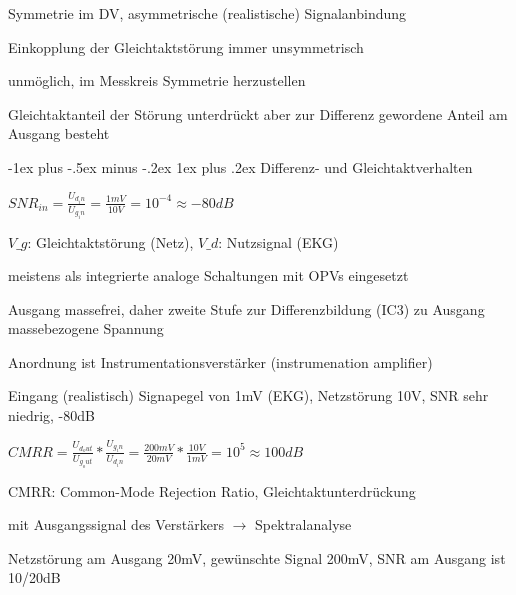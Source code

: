 \documentclass[a4paper]{article}
\makeatletter
\renewcommand{\subsubsection}{\@startsection{subsubsection}{3}{0mm}%
 {-1ex plus -.5ex minus -.2ex}%
 {1ex plus .2ex}%
 {\normalfont\small\bfseries}}
\makeatother
\begin{document}
\begin{multicols}{3}
  Symmetrie im DV, asymmetrische (realistische) Signalanbindung
  \begin{itemize*}
    \item Einkopplung der Gleichtaktstörung immer unsymmetrisch
    \item unmöglich, im Messkreis Symmetrie herzustellen
    \item Gleichtaktanteil der Störung unterdrückt aber zur Differenz gewordene Anteil am Ausgang besteht
  \end{itemize*}

  \subsubsection{Differenz- und Gleichtaktverhalten}\label{differenz--und-gleichtaktverhalten}
  \begin{itemize*}
    \item $SNR_{in} = \frac{U_{d_in}}{U_{g_in}}=\frac{1mV}{10V}=10^{-4}\approx -80dB$
    \item $V\_g$: Gleichtaktstörung (Netz), $V\_d$: Nutzsignal (EKG)
    \item meistens als integrierte analoge Schaltungen mit OPVs eingesetzt
    \item Ausgang massefrei, daher zweite Stufe zur Differenzbildung (IC3) zu Ausgang massebezogene Spannung
    \item Anordnung ist Instrumentationsverstärker (instrumenation amplifier)
    \item Eingang (realistisch) Signapegel von 1mV (EKG), Netzstörung 10V, SNR sehr niedrig, -80dB
    \item $CMRR=\frac{U_{d_out}}{U_{g_out}}*\frac{U_{g_in}}{U_{d_in}}=\frac{200mV}{20mV} *\frac{10V}{1mV}=10^5 \approx 100dB$
    \item CMRR: Common-Mode Rejection Ratio, Gleichtaktunterdrückung
    \item mit Ausgangssignal des Verstärkers $\rightarrow$ Spektralanalyse
    \item Netzstörung am Ausgang 20mV, gewünschte Signal 200mV, SNR am Ausgang ist 10/20dB
  \end{itemize*}


\end{multicols}
\end{document}
